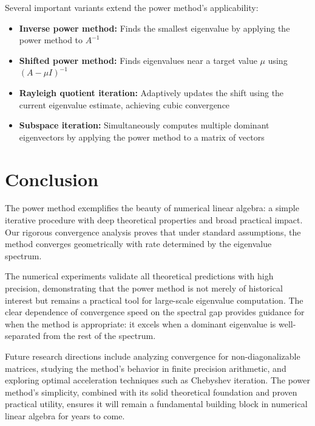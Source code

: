 \documentclass[11pt,a4paper]{article}
\begin{document}
Several important variants extend the power method's applicability:
\begin{itemize}
    \item \textbf{Inverse power method:} Finds the smallest eigenvalue by applying the power method to $A^{-1}$
    \item \textbf{Shifted power method:} Finds eigenvalues near a target value $\mu$ using $(A - \mu I)^{-1}$
    \item \textbf{Rayleigh quotient iteration:} Adaptively updates the shift using the current eigenvalue estimate, achieving cubic convergence
    \item \textbf{Subspace iteration:} Simultaneously computes multiple dominant eigenvectors by applying the power method to a matrix of vectors
\end{itemize}

\section{Conclusion}

The power method exemplifies the beauty of numerical linear algebra: a simple iterative procedure with deep theoretical properties and broad practical impact. Our rigorous convergence analysis proves that under standard assumptions, the method converges geometrically with rate determined by the eigenvalue spectrum.

The numerical experiments validate all theoretical predictions with high precision, demonstrating that the power method is not merely of historical interest but remains a practical tool for large-scale eigenvalue computation. The clear dependence of convergence speed on the spectral gap provides guidance for when the method is appropriate: it excels when a dominant eigenvalue is well-separated from the rest of the spectrum.

Future research directions include analyzing convergence for non-diagonalizable matrices, studying the method's behavior in finite precision arithmetic, and exploring optimal acceleration techniques such as Chebyshev iteration. The power method's simplicity, combined with its solid theoretical foundation and proven practical utility, ensures it will remain a fundamental building block in numerical linear algebra for years to come.
\end{document}
